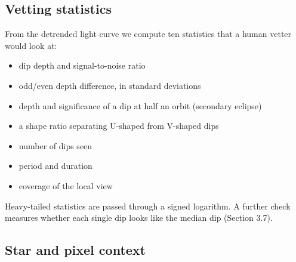 \documentclass[fleqn,usenatbib]{mnras}
\providecommand{\tightlist}{\setlength{\itemsep}{0pt}\setlength{\parskip}{0pt}}
\begin{document}
\subsection{Vetting statistics}

From the detrended light curve we compute ten statistics that a human vetter would look at:

\begin{itemize}
\tightlist
\item
  dip depth and signal-to-noise ratio
\item
  odd/even depth difference, in standard deviations
\item
  depth and significance of a dip at half an orbit (secondary eclipse)
\item
  a shape ratio separating U-shaped from V-shaped dips
\item
  number of dips seen
\item
  period and duration
\item
  coverage of the local view
\end{itemize}

Heavy-tailed statistics are passed through a signed logarithm. A further check measures whether each single dip looks like the median dip (Section 3.7).

\subsection{Star and pixel context}
\end{document}
